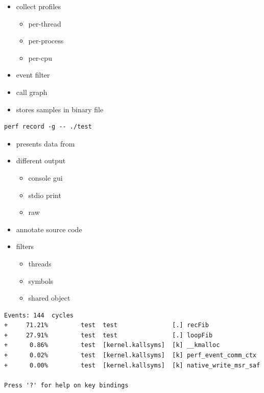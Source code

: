 \begin{frame}[fragile]{}
\begin{itemize}
  \item collect profiles
  \begin{itemize}
    \item per-thread
    \item per-process
    \item per-cpu
  \end{itemize}
  \item event filter
  \item call graph
  \item stores samples in binary file
\end{itemize}
\pause
\begin{lstlisting}
perf record -g -- ./test
\end{lstlisting}
\end{frame}

\begin{frame}[fragile]{}
\begin{itemize}
  \item presents data from 
  \item different output
  \begin{itemize}
    \item console gui
    \item stdio print
    \item raw
  \end{itemize}
  \item annotate source code
  \item filters 
  \begin{itemize}
    \item threads
    \item symbols
    \item shared object
  \end{itemize}
\end{itemize}
\begin{lstlisting}[basicstyle=\tiny\ttfamily]
Events: 144  cycles                                                    
+     71.21%         test  test               [.] recFib              
+     27.91%         test  test               [.] loopFib             
+      0.86%         test  [kernel.kallsyms]  [k] __kmalloc           
+      0.02%         test  [kernel.kallsyms]  [k] perf_event_comm_ctx 
+      0.00%         test  [kernel.kallsyms]  [k] native_write_msr_saf
                                                                      
Press '?' for help on key bindings                                     
\end{lstlisting}
\end{frame}

